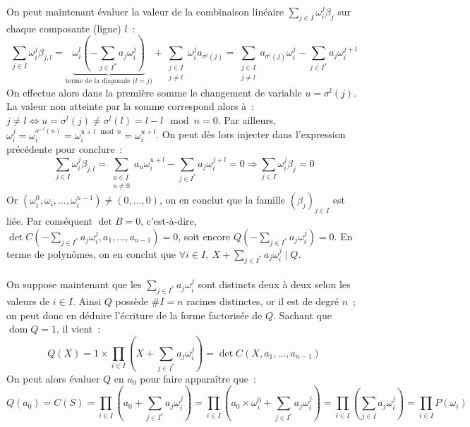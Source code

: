 \documentclass{article}
\DeclareMathOperator{\dom}{dom}
\begin{document}
  On peut maintenant évaluer la valeur de la combinaison linéaire $\sum_{j\in I} \omega_i^j \beta_j$ sur chaque composante (ligne) $l$~:
  \[
     \sum_{j\in I} \omega_i^j \beta_{j,l} = \underbrace{\omega_i^l \left(-\sum_{j\in I^*} a_j \omega_i^j\right)}_{\text{terme de la diagonale ($l = j$)}} + \sum_{\substack{j\in I \\ j \neq l}} \omega_i^j a_{\sigma^l(j)}
     = \sum_{\substack{j\in I \\ j \neq l}} a_{\sigma^l(j)}\omega_i^j - \sum_{j\in I^*} a_j \omega_i^{j+l}
  \]
  On effectue alors dans la première somme le changement de variable $u = \sigma^l(j)$. La valeur non atteinte par la somme correspond alors à~: $j\neq l \iff u = \sigma^l(j) \neq \sigma^l(l) = l - l \mod n = 0$. Par ailleurs, $\omega_i^j = \omega_i^{\sigma^{-l}(u)} = \omega_i^{u + l \mod n} = \omega_i^{u+l}$. On peut dès lors injecter dans l'expression précédente pour conclure~:
  \[
    \sum_{j\in I} \omega_i^j \beta_{j,l} = \sum_{\substack{u\in I \\ u \neq 0}} a_{u}\omega_i^{u+l} - \sum_{j\in I^*} a_j \omega_i^{j+l} = 0 \Longrightarrow \sum_{j\in I} \omega_i^j \beta_j = 0
  \]
  Or $(\omega_i^0, \omega_i, \dots, \omega_i^{n-1}) \neq (0, \dots, 0)$, on en conclut que la famille $(\beta_j)_{j\in I}$ est liée. Par conséquent $\det B = 0$, c'est-à-dire, $\det C\left(-\sum_{j\in I^*} a_j \omega_i^j, a_1, \dots, a_{n-1}\right) = 0$, soit encore $Q\left(-\sum_{j\in I^*} a_j \omega_i^j\right) = 0$. En terme de polynômes, on en conclut que $\forall i\in I,\: X + \sum_{j\in I^*} a_j \omega_i^j \mid Q$.

  \paragraph{} On suppose maintenant que les $\sum_{j\in I^*} a_j \omega_i^j$ sont distincts deux à deux selon les valeurs de $i\in I$. Ainsi $Q$ possède $\# I = n$ racines distinctes, or il est de degré $n$~; on peut donc en déduire l'écriture de la forme factorisée de $Q$. Sachant que $\dom Q = 1$, il vient~:
  \[
    Q(X) = 1 \times \prod_{i\in I} \left(X + \sum_{j\in I^*} a_j \omega_i^j\right) = \det C(X, a_1, \dots, a_{n-1})
  \]
  On peut alors évaluer $Q$ en $a_0$ pour faire apparaître que~:
  \[
    Q(a_0) = C(S) = \prod_{i\in I} \left(a_0 + \sum_{j\in I^*} a_j \omega_i^j\right)
    = \prod_{i\in I} \left(a_0 \times \omega_i^0 + \sum_{j\in I^*} a_j \omega_i^j\right)
    = \prod_{i\in I} \left(\sum_{j\in I} a_j \omega_i^j\right) = \prod_{i\in I} P(\omega_i)
  \]
\end{document}
